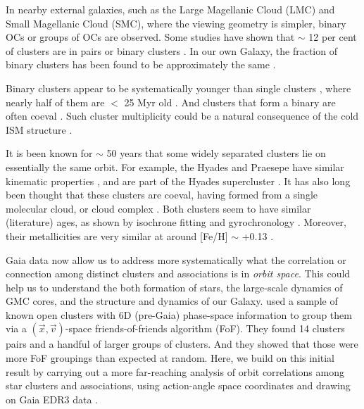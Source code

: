\documentclass[twocolumn]{aastex631}
\begin{document}
In nearby external galaxies, such as the Large Magellanic Cloud (LMC) and Small Magellanic Cloud (SMC), where the viewing geometry is simpler, binary OCs or groups of OCs are observed. Some studies have shown that $\sim$ 12 per cent of clusters are in pairs or binary clusters \citep{2000AcA....50..355P}. In our own Galaxy, the fraction of binary clusters has been found to be approximately the same \citep{2009A&A...500L..13D}.

Binary clusters appear to be systematically younger than single clusters \citep{2002A&A...391..547D,2016A&A...586A..41P}, where nearly half of them are $<$ 25 Myr old \citep{2009A&A...500L..13D}. And clusters that form a binary are often coeval \citep{1993A&A...267...59K,2012ApJ...746L..19M}. Such cluster multiplicity could be a natural consequence of the cold ISM structure \citep{1996ApJ...471..816E}.

It is been known for $\sim$ 50 years that some widely separated clusters lie on essentially the same orbit. For example, the Hyades and Praesepe have similar kinematic properties \citep{1959Obs....79..143E,1960MNRAS.120..540E}, and are part of the Hyades supercluster \citep{2015ApJ...807...24B}. It has also long been thought that these clusters are coeval, having formed from a single molecular cloud, or cloud complex \citep{2013ApJ...775...58B}. Both clusters seem to have similar (literature) ages, as shown by isochrone fitting \citep{1998A&A...331...81P,2004A&A...414..163S} and gyrochronology \citep{2014ApJ...795..161D,2014MNRAS.442.2081K}. Moreover, their metallicities are very similar at around [Fe/H] $\sim$ +0.13 \citep{2013ApJ...775...58B}. 

Gaia data now allow us to address more systematically what the correlation or connection among distinct clusters and associations is in \emph{orbit space}.  
This could help us to understand the both formation of stars, the large-scale dynamics of GMC cores, and the structure and dynamics of our Galaxy.  \citet{2017A&A...600A.106C} used a sample of known open clusters with 6D (pre-Gaia) phase-space information to group them via a $(\vec{x},\vec{v})$-space friends-of-friends algorithm (FoF).  They found 14 clusters pairs and a handful of larger groups of clusters. And they showed that those were more FoF groupings than expected at random. Here, we build on this initial result by carrying out a more far-reaching analysis of orbit correlations among star clusters and associations, using action-angle space coordinates and drawing on Gaia EDR3 data \citep{2020arXiv201203380L}.
\end{document}
